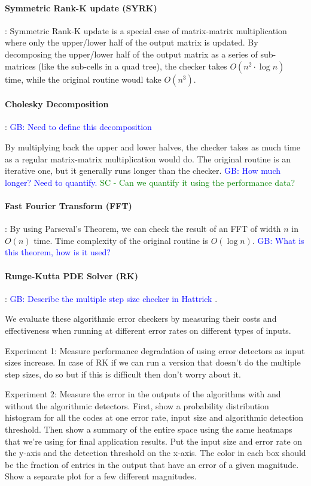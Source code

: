 \documentclass[prodmode,acmtecs]{acmconf} %
\newcommand{\sui}[1]{%
  \textcolor{green}{SC - #1}
}
\newcommand{\greg}[1]{%
  \textcolor{blue}{GB: #1}
}
\begin{document}
\paragraph{Symmetric Rank-K update (SYRK)}:
Symmetric Rank-K update is a special case of matrix-matrix multiplication where only the upper/lower half of the output matrix is updated. By decomposing the upper/lower half of the output matrix as a series of sub-matrices (like the sub-cells in a quad tree), the checker takes $O(n^2 \cdot \log{n})$ time, while the original routine woudl take $O(n^3)$.

\paragraph{Cholesky Decomposition}: \greg{Need to define this decomposition}
By multiplying back the upper and lower halves, the checker takes as much time as a regular matrix-matrix multiplication would do. The original routine is an iterative one, but it generally runs longer than the checker. \greg{How much longer? Need to quantify.} \sui{Can we quantify it using the performance data?}

\paragraph{Fast Fourier Transform (FFT)}:
By using Parseval's Theorem, we can check the result of an FFT of width $n$ in $O(n)$ time. Time complexity of the original routine is $O(\log{n})$.
\greg{What is this theorem, how is it used?}

\paragraph{Runge-Kutta PDE Solver (RK)}:
\greg{Describe the multiple step size checker in Hattrick}.

We evaluate these algorithmic error checkers by measuring their costs and effectiveness when running at different error rates on different types of inputs.

Experiment 1: Measure performance degradation of using error detectors as input sizes increase. In case of RK if we can run a version that doesn't do the multiple step sizes, do so but if this is difficult then don't worry about it.

Experiment 2: Measure the error in the outputs of the algorithms with and without the algorithmic detectors.
First, show a probability distribution histogram for all the codes at one error rate, input size and algorithmic detection threshold.
Then show a summary of the entire space using the same heatmaps that we're using for final application results.
Put the input size and error rate on the y-axis and the detection threshold on the x-axis.
The color in each box should be the fraction of entries in the output that have an error of a given magnitude.
Show a separate plot for a few different magnitudes.
\end{document}
